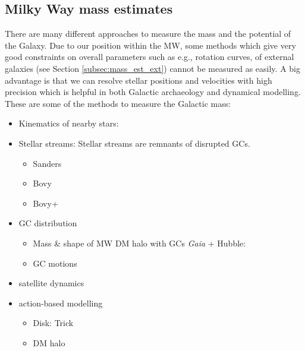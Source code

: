 \subsection{Milky Way mass estimates}\label{subsec:mass_est_MW}
There are many different approaches to measure the mass and the potential of the Galaxy. Due to our position within the \ac{MW}, some methods which give very good constraints on overall parameters such as e.g., rotation curves, of external galaxies (see Section \ref{subsec:mass_est_ext}) cannot be measured as easily. A big advantage is that we can resolve stellar positions and velocities with high precision which is helpful in both Galactic archaeology and dynamical modelling. These are some of the methods to measure the Galactic mass:
\begin{itemize}
    \item Kinematics of nearby stars: \cite{Kuijken...LocalDMdens...1989, Bovy...LocalDMdens...2012}
    \item Stellar streams: Stellar streams are remnants of disrupted \acp{GC}. 
    \begin{itemize}
        \item Sanders \citep{Streams...Sanders...2014}
        \item Bovy \citep{Streams...Bovy...2014}
        \item Bovy+ \citep{Streams..GD1..Pal5...Bovy...2016}
    \end{itemize}
    \item \ac{GC} distribution 
    \begin{itemize}
        \item Mass \& shape of \ac{MW} \ac{DM} halo with \acp{GC} \textit{Gaia} + Hubble: \cite{Posti...MWmassGCs...2018}
        \item GC motions \citep{MWmass...GCmotions...Watkins...2018}
    \end{itemize}
    \item satellite dynamics \citep{MWmass...sat...dyn}
    \item action-based modelling
    \begin{itemize}
        \item Disk: Trick \citep{Wilmathesis}
        \item DM halo \citep{Sanderson...gravpotstreams...2017} 
    \end{itemize}
    
\end{itemize}


